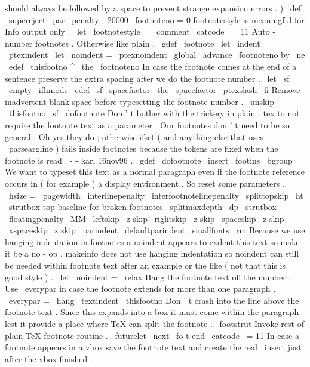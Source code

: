 {{{{should
always
be
followed
by
a
%
space
to
prevent
strange
expansion
errors
.
)
\
def
\
supereject
{
\
par
\
penalty
-
20000
\
footnoteno
=
0
}
%
footnotestyle
is
meaningful
for
Info
output
only
.
\
let
\
footnotestyle
=
\
comment
{
\
catcode
\
=
11
%
%
Auto
-
number
footnotes
.
Otherwise
like
plain
.
\
gdef
\
footnote
{
%
\
let
\
indent
=
\
ptexindent
\
let
\
noindent
=
\
ptexnoindent
\
global
\
advance
\
footnoteno
by
\
ne
\
edef
\
thisfootno
{
^
{
\
the
\
footnoteno
}
}
%
%
%
In
case
the
footnote
comes
at
the
end
of
a
sentence
preserve
the
%
extra
spacing
after
we
do
the
footnote
number
.
\
let
\
sf
\
empty
\
ifhmode
\
edef
\
sf
{
\
spacefactor
\
the
\
spacefactor
}
\
ptexslash
\
fi
%
%
Remove
inadvertent
blank
space
before
typesetting
the
footnote
number
.
\
unskip
\
thisfootno
\
sf
\
dofootnote
}
%
%
Don
'
t
bother
with
the
trickery
in
plain
.
tex
to
not
require
the
%
footnote
text
as
a
parameter
.
Our
footnotes
don
'
t
need
to
be
so
general
.
%
%
Oh
yes
they
do
;
otherwise
ifset
(
and
anything
else
that
uses
%
\
parseargline
)
fails
inside
footnotes
because
the
tokens
are
fixed
when
%
the
footnote
is
read
.
-
-
karl
16nov96
.
%
\
gdef
\
dofootnote
{
%
\
insert
\
footins
\
bgroup
%
We
want
to
typeset
this
text
as
a
normal
paragraph
even
if
the
%
footnote
reference
occurs
in
(
for
example
)
a
display
environment
.
%
So
reset
some
parameters
.
\
hsize
=
\
pagewidth
\
interlinepenalty
\
interfootnotelinepenalty
\
splittopskip
\
ht
\
strutbox
%
top
baseline
for
broken
footnotes
\
splitmaxdepth
\
dp
\
strutbox
\
floatingpenalty
\
MM
\
leftskip
\
z
skip
\
rightskip
\
z
skip
\
spaceskip
\
z
skip
\
xspaceskip
\
z
skip
\
parindent
\
defaultparindent
%
\
smallfonts
\
rm
%
%
Because
we
use
hanging
indentation
in
footnotes
a
noindent
appears
%
to
exdent
this
text
so
make
it
be
a
no
-
op
.
makeinfo
does
not
use
%
hanging
indentation
so
noindent
can
still
be
needed
within
footnote
%
text
after
an
example
or
the
like
(
not
that
this
is
good
style
)
.
\
let
\
noindent
=
\
relax
%
%
Hang
the
footnote
text
off
the
number
.
Use
\
everypar
in
case
the
%
footnote
extends
for
more
than
one
paragraph
.
\
everypar
=
{
\
hang
}
%
\
textindent
{
\
thisfootno
}
%
%
%
Don
'
t
crash
into
the
line
above
the
footnote
text
.
Since
this
%
expands
into
a
box
it
must
come
within
the
paragraph
lest
it
%
provide
a
place
where
TeX
can
split
the
footnote
.
\
footstrut
%
%
Invoke
rest
of
plain
TeX
footnote
routine
.
\
futurelet
\
next
\
fo
t
}
}
%
end
\
catcode
\
=
11
%
In
case
a
footnote
appears
in
a
vbox
save
the
footnote
text
and
create
%
the
real
\
insert
just
after
the
vbox
finished
.
}}}}
